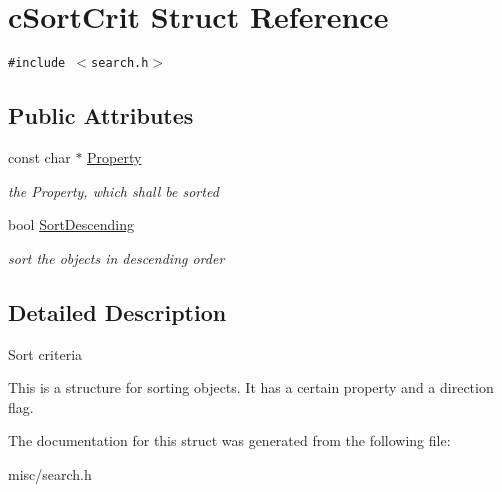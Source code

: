 \hypertarget{structcSortCrit}{
\section{cSortCrit Struct Reference}
\label{structcSortCrit}
}
{\tt \#include $<$search.h$>$}

\subsection*{Public Attributes}
\begin{CompactItemize}
\item 
\hypertarget{structcSortCrit_fedfdc7edd9ec85496338f52df0a04d1}{
const char $\ast$ \hyperlink{structcSortCrit_fedfdc7edd9ec85496338f52df0a04d1}{Property}}
\label{structcSortCrit_fedfdc7edd9ec85496338f52df0a04d1}

\begin{CompactList}\small\item\em the Property, which shall be sorted \item\end{CompactList}\item 
\hypertarget{structcSortCrit_ca3564efa1903ab8b1ba144d43c6715f}{
bool \hyperlink{structcSortCrit_ca3564efa1903ab8b1ba144d43c6715f}{SortDescending}}
\label{structcSortCrit_ca3564efa1903ab8b1ba144d43c6715f}

\begin{CompactList}\small\item\em sort the objects in descending order \item\end{CompactList}\end{CompactItemize}


\subsection{Detailed Description}
Sort criteria

This is a structure for sorting objects. It has a certain property and a direction flag. 

The documentation for this struct was generated from the following file:\begin{CompactItemize}
\item 
misc/search.h\end{CompactItemize}
